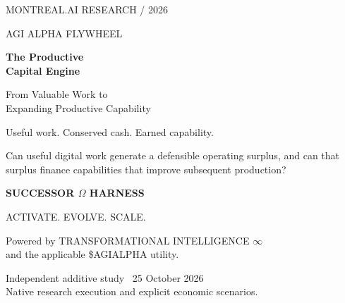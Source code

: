 \documentclass[11pt,a4paper]{article}
\begin{document}
\hypersetup{pageanchor=false}
\begin{titlepage}
\color{white}
\vspace*{1.2cm}
{\large\sffamily MONTREAL.AI \hfill RESEARCH / 2026}\par
\vspace{2cm}
{\Large\sffamily AGI ALPHA FLYWHEEL}\par
\vspace{0.6cm}
{\fontsize{39}{48}\selectfont\bfseries The Productive\\Capital Engine\par}
\vspace{0.8cm}
{\Large From Valuable Work to\\Expanding Productive Capability\par}
\vspace{1.3cm}
{\large Useful work. Conserved cash. Earned capability.}\par
\vfill
\begin{minipage}{.85\linewidth}
\large Can useful digital work generate a defensible operating surplus, and can that surplus finance capabilities that improve subsequent production?
\end{minipage}
\vspace{1.4cm}\par
{\large\bfseries SUCCESSOR $\Omega$ HARNESS}\par
{\sffamily ACTIVATE. EVOLVE. SCALE.}\par
\vspace{0.3cm}
{\small Powered by TRANSFORMATIONAL INTELLIGENCE $\infty$\\and the applicable \$AGIALPHA utility.}\par
\vspace{1.0cm}
{\small Independent additive study \textbullet\ 25 October 2026\\Native research execution and explicit economic scenarios.}
\end{titlepage}
\setcounter{page}{1}
\hypersetup{pageanchor=true}
\end{document}
